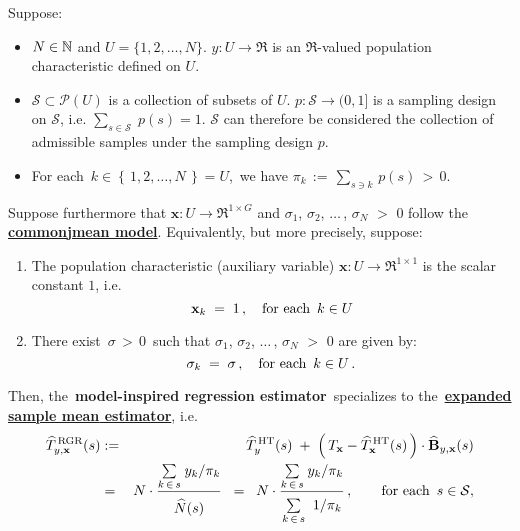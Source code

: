 \begin{proposition}
\mbox{}
\vskip 0.05cm
\noindent
Suppose:
\begin{itemize}
\item
	$N \in \mathbb{N}$ and $U = \{1,2,\ldots,N\}$.
	\vskip 0.05cm
	$y : U \longrightarrow \Re$ is an $\Re$-valued population characteristic defined on $U$.
\item
	$\mathcal{S} \subset \mathcal{P}(U)$ is a collection of subsets of $U$.
	$p : \mathcal{S} \longrightarrow (0,1]$ is a sampling design on $\mathcal{S}$,
	i.e. $\underset{s\in\mathcal{S}}{\sum}\;p(s) = 1$.
	\vskip 0.05cm
	$\mathcal{S}$ can therefore be considered the collection of admissible samples under the sampling design $p$.
\item
	For each \,$k \in \left\{\,1,2,\ldots,N\,\right\} = U$,\, we have
	$\pi_{k} \,:=\, \underset{s \ni k}{\sum}\,p(s) \,>\, 0$.
\end{itemize}
Suppose furthermore that
$\mathbf{x} : U \longrightarrow \Re^{1 \times G}$ and
$\sigma_{1}$, $\sigma_{2}$, $\ldots$\,, $\sigma_{N}$ $>$ $0$
follow the \,\underline{\textbf{{\color{red}common}{\color{white}j}mean model}}.
\renewcommand{\theenumi}{\alph{enumi}}
\renewcommand{\labelenumi}{\textnormal{(\theenumi)}$\;\;$}
\vskip 0.1cm
\noindent
Equivalently, but more precisely, suppose:
\begin{enumerate}
\item \vskip -0.10cm
	The population characteristic (auxiliary variable)
	$\mathbf{x} : U \longrightarrow \Re^{1 \times 1}$ is the scalar constant $1$, i.e.
	\begin{equation*}
	\mathbf{x}_{k}
		\; = \; 1\,,
	\quad\textnormal{for each \,$k \in U$}
	\end{equation*}
\item
	There exist \,$\sigma \,>\, 0$\, such that
	$\sigma_{1}$, $\sigma_{2}$, $\ldots$\,, $\sigma_{N}$ $>$ $0$ are given by:
	\begin{equation*}
	\sigma_{k} \; = \; \sigma\,,
	\quad\textnormal{for each \,$k \in U$}\,.
	\end{equation*}
\end{enumerate}
\renewcommand{\theenumi}{\roman{enumi}}
\renewcommand{\labelenumi}{\textnormal{(\theenumi)}$\;\;$}
Then, the \,\textbf{model-inspired regression estimator}\,
specializes to the \,\underline{\textbf{{\color{red}expanded sample mean} estimator}}, i.e.
\begin{eqnarray*}
\widehat{T}^{\,\textnormal{RGR}}_{y,\mathbf{x}}(s)
& := &
	\widehat{T}^{\,\textnormal{HT}}_{y}(s)
	\; + \;
	\left(\,T_{\mathbf{x}} - \widehat{T}^{\,\textnormal{HT}}_{\mathbf{x}}(s) \,\right)
	\cdot
	\widehat{\mathbf{B}}_{y,\mathbf{x}}(s)
\\
& = &
	N \cdot
	\dfrac{
		\underset{k\,\in\,s}{\sum}\;y_{k}/\pi_{k}
		}{
		\overset{{\color{white}.}}{\widehat{N}(s)}
		}
\;\; = \;\;
	N \cdot
	\dfrac{
		\underset{k\,\in\,s}{\sum}\;y_{k}/\pi_{k}
		}{
		\underset{k\,\in\,s}{\overset{{\color{white}.}}{\sum}}\;\;1/\pi_{k}
		}
	\,,\quad\quad\textnormal{for each \,$s \in \mathcal{S}$},
\end{eqnarray*}
\end{proposition}
